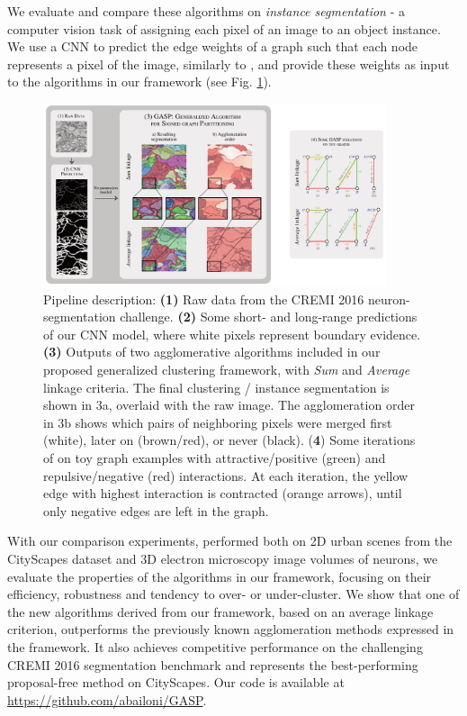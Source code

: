 We evaluate and compare these algorithms on \emph{instance segmentation} - a computer vision task of assigning each pixel of an image to an object instance. 
We use a CNN to predict the edge weights of a graph such that each node represents a pixel of the image, similarly to \cite{liu2018affinity,lee2017superhuman,wolf2018mutex}, and provide these weights as input to the algorithms in our framework (see Fig. \ref{fig:intro_figure}). 

\begin{figure}[t]
\centering
\includegraphics[width=0.9\textwidth]{figs/intro_image_v3.pdf} %
\caption{ Pipeline description: \textbf{(1)} Raw data from the CREMI 2016 neuron-segmentation challenge. \textbf{(2)} Some short- and long-range predictions of our CNN model, where white pixels represent boundary evidence. \textbf{(3)} Outputs of two agglomerative algorithms included in our proposed generalized clustering framework, with \emph{Sum} and \emph{Average} linkage criteria. The final clustering / instance segmentation is shown in 3a, overlaid with the raw image.  The  agglomeration order in 3b shows which pairs of neighboring pixels were merged first (white), later on (brown/red), or never (black). (\textbf{4}) Some iterations of \algname{} on toy graph examples with attractive/positive (green) and repulsive/negative (red) interactions. At each iteration, the yellow edge with highest interaction is contracted (orange arrows), until only negative edges are left in the graph.
\label{fig:intro_figure}}
\end{figure}


With our comparison experiments, performed both on 2D urban scenes from the CityScapes dataset and 3D electron microscopy image volumes of neurons, we evaluate the properties of the algorithms in our framework, focusing on their efficiency, robustness and tendency to over- or under-cluster.
We show that one of the new algorithms derived from our framework, based on an average linkage criterion, outperforms the previously known agglomeration methods expressed in the framework. It also achieves competitive performance on the challenging CREMI 2016 segmentation benchmark and represents the best-performing proposal-free method on CityScapes.
Our code is available at \url{https://github.com/abailoni/GASP}.


